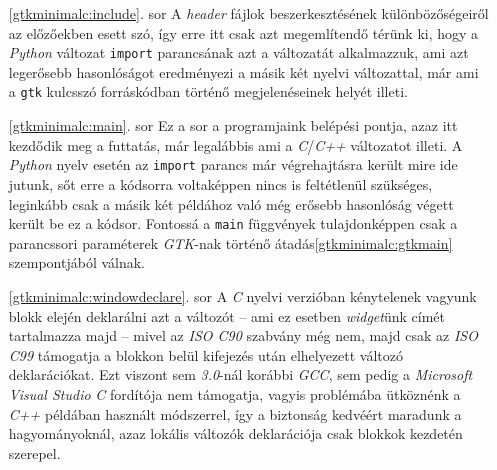 \begin{enumerate}
 \item[\ref{gtkminimalc:include}. sor] A \textit{header} fájlok beszerkesztésének különbözőségeiről az előzőekben esett szó, így erre itt csak azt megemlítendő térünk ki, hogy a \textit{Python} változat \texttt{import} parancsának azt a változatát alkalmazzuk, ami azt legerősebb hasonlóságot eredményezi a másik két nyelvi változattal, már ami a \texttt{gtk} kulcsszó forráskódban történő megjelenéseinek helyét illeti.

 \item[\ref{gtkminimalc:main}. sor] Ez a sor a programjaink belépési pontja, azaz itt kezdődik meg a futtatás, már legalábbis ami a \textit{C}/\textit{C++} változatot illeti. A \textit{Python} nyelv esetén az \texttt{import} parancs már végrehajtásra került mire ide jutunk, sőt erre a kódsorra voltaképpen nincs is feltétlenül szükséges\cite[fej.~27.4.]{pythonlib}, leginkább csak a másik két példához való még erősebb hasonlóság végett került be ez a kódsor. Fontossá a \texttt{main} függvények tulajdonképpen csak a parancssori paraméterek \textit{GTK}-nak történő átadás\ref{gtkminimalc:gtkmain} szempontjából válnak.

 \item[\ref{gtkminimalc:windowdeclare}. sor] A \textit{C} nyelvi verzióban kénytelenek vagyunk blokk elején deklarálni azt a változót -- ami ez esetben \textit{widget}ünk címét tartalmazza majd -- mivel az \textit{ISO C90} szabvány még nem, majd csak az \textit{ISO C99} támogatja a blokkon belül kifejezés után elhelyezett változó deklarációkat. Ezt viszont sem \textit{3.0}-nál korábbi \textit{GCC}, sem pedig a \textit{Microsoft Visual Studio} \textit{C} fordítója nem támogatja, vagyis problémába ütköznénk a \textit{C++} példában használt módszerrel, így a biztonság kedvéért maradunk a hagyományoknál, azaz lokális változók deklarációja csak blokkok kezdetén szerepel.


\end{enumerate}
